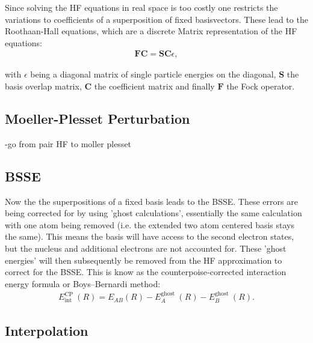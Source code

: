 Since solving the \ac{HF} equations in real space is too costly one restricts the variations to coefficients of a superposition of fixed basisvectors. These lead to the Roothaan-Hall equations, which are a discrete Matrix representation of the \ac{HF} equations:
\begin{align}
	\mathbf{F C}=\mathbf{S C} \epsilon,
\end{align} 

with $\epsilon$ being a diagonal matrix of single particle energies on the diagonal, $\mathbf{S}$ the basis overlap matrix, $\mathbf{C}$ the coefficient matrix and finally $\mathbf{F}$ the Fock operator.
\subsection{Moeller-Plesset Perturbation}
-go from pair HF to moller plesset
\subsection{\ac{BSSE}}
Now the the superpositions of a fixed basis leads to the \ac{BSSE}. These errors are being corrected for by using 'ghost calculations', essentially the same calculation with one atom being removed (i.e. the extended two atom centered basis stays the same). This means the basis will have access to the second electron states, but the nucleus and additional electrons are not accounted for. These 'ghost energies' will then subsequently be removed from the \ac{HF}
approximation to correct for the \ac{BSSE}.
This is know as the counterpoise‐corrected interaction energy formula or Boys–Bernardi method: %
\begin{align}
	E_{\text {int }}^{\text {CP }}(R)=E_{A B}(R)-E_A^{\text {ghost }}(R)-E_B^{\text {ghost }}(R).
\end{align}

\subsection{Interpolation}

